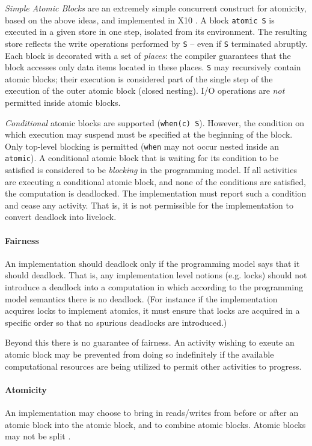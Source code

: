 \documentclass[twocolumn]{article}
\def\Xten{{\sf X10}}
\begin{document}
{\em Simple Atomic Blocks} are an extremely simple concurrent
construct for atomicity, based on the above ideas, and implemented in
\Xten{} \cite{concur05,X10OOPSLA}. A block {\tt atomic S} is executed
in a given store in one step, isolated from its environment. The
resulting store reflects the write operations performed by {\tt S} --
even if {\tt S} terminated abruptly.  Each block is decorated with a
set of {\em places}: the compiler guarantees that the block accesses
only data items located in these places. {\tt S} may recursively
contain atomic blocks; their execution is considered part of the
single step of the execution of the outer atomic block (closed
nesting). I/O operations are {\em not} permitted inside atomic blocks.

{\em Conditional} atomic blocks are supported ({\tt when(c)
S}). However, the condition on which execution may suspend must be
specified at the beginning of the block. Only top-level blocking is
permitted ({\tt when} may not occur nested inside an {\tt atomic}). A
conditional atomic block that is waiting for its condition to be
satisfied is considered to be {\em blocking} in the programming
model. If all activities are executing a conditional atomic block, and
none of the conditions are satisfied, the computation is
deadlocked. The implementation must report such a condition and cease
any activity. That is, it is not permissible for the implementation to
convert deadlock into livelock.

\paragraph{Fairness}
An implementation should deadlock only if the
programming model says that it should deadlock. That is, any
implementation level notions (e.g.{} locks) should not introduce a
deadlock into a computation in which according to the programming
model semantics there is no deadlock. (For instance if the
implementation acquires locks to implement atomics, it must ensure
that locks are acquired in a specific order so that no spurious
deadlocks are introduced.)

Beyond this there is no guarantee of fairness. An activity wishing to
exeute an atomic block may be prevented from doing so indefinitely if
the available computational resources are being utilized to permit
other activities to progress. 

\paragraph{Atomicity}
An implementation may choose to bring in reads/writes from
before or after an atomic block into the atomic block, and to combine
atomic blocks. Atomic blocks may not be split \cite{rao}.
\end{document}
